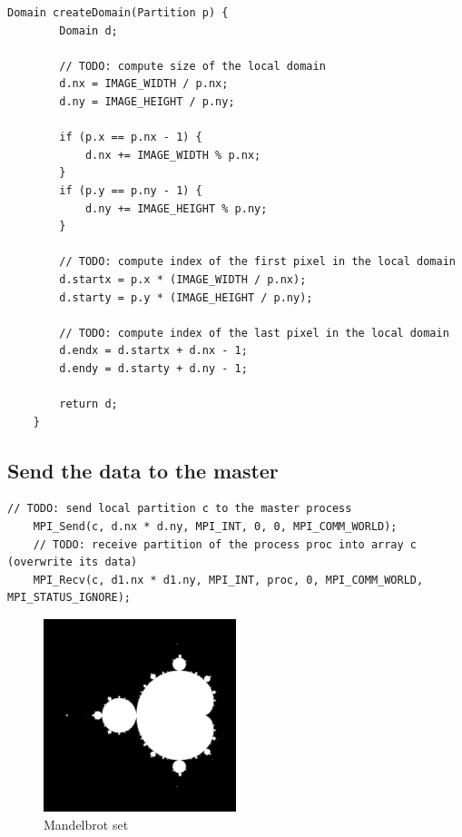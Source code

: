 \documentclass[unicode,11pt,a4paper,oneside,numbers=endperiod,openany]{scrartcl}
\begin{document}
\begin{lstlisting}[style=mystyle, language=MyC++, caption={Creating a Local Domain}]
    Domain createDomain(Partition p) {
        Domain d;
        
        // TODO: compute size of the local domain
        d.nx = IMAGE_WIDTH / p.nx;
        d.ny = IMAGE_HEIGHT / p.ny;
    
        if (p.x == p.nx - 1) {
            d.nx += IMAGE_WIDTH % p.nx;
        }
        if (p.y == p.ny - 1) {
            d.ny += IMAGE_HEIGHT % p.ny;
        }
        
        // TODO: compute index of the first pixel in the local domain
        d.startx = p.x * (IMAGE_WIDTH / p.nx);
        d.starty = p.y * (IMAGE_HEIGHT / p.ny);
    
        // TODO: compute index of the last pixel in the local domain
        d.endx = d.startx + d.nx - 1;
        d.endy = d.starty + d.ny - 1;
    
        return d;
    }
\end{lstlisting}

\subsection{Send the data to the master}
\begin{lstlisting}[style=mystyle, language=MyC++, caption={Sending and Receiving Local Partition Data}]
    // TODO: send local partition c to the master process
    MPI_Send(c, d.nx * d.ny, MPI_INT, 0, 0, MPI_COMM_WORLD); 
    // TODO: receive partition of the process proc into array c (overwrite its data)
    MPI_Recv(c, d1.nx * d1.ny, MPI_INT, proc, 0, MPI_COMM_WORLD, MPI_STATUS_IGNORE);
\end{lstlisting}

\begin{figure}[h]
    \centering
    \includegraphics[width=0.5\textwidth]{pictures/mandel.png}
    \caption{Mandelbrot set}
\end{figure}
\end{document}
